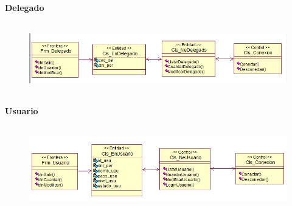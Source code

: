 \documentclass[12pt]{report}
\begin{document}
\begin{itemize}

\par

{\fontsize{10pt}{12.0pt}\selectfont \textbf{Delegado}\par}\par




\begin{figure}[H]
	\begin{Center}
		\includegraphics[width=6.29in,height=1.23in]{./media/image11.png}
	\end{Center}
\end{figure}



\par

{\fontsize{10pt}{12.0pt}\selectfont \textbf{Usuario}\par}\par




\begin{figure}[H]
	\begin{Center}
		\includegraphics[width=6.33in,height=1.46in]{./media/image12.png}
	\end{Center}
\end{figure}



\par


\end{itemize}
\end{document}
